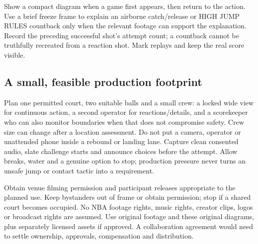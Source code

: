 \documentclass[11pt]{article}
\begin{document}
Show a compact diagram when a game first appears, then return to the action.
Use a brief freeze frame to explain an airborne catch/release or HIGH JUMP RULES
countback only when the relevant footage can support the explanation. Record
the preceding successful shot's attempt count; a countback cannot be truthfully
recreated from a reaction shot. Mark replays and keep the real score visible.

\subsection{A small, feasible production footprint}
Plan one permitted court, two suitable balls and a small crew: a locked wide
view for continuous action, a second operator for reactions/details, and a
scorekeeper who can also monitor boundaries when that does not compromise
safety. Crew size can change after a location assessment. Do not put a camera,
operator or unattended phone inside a rebound or landing lane. Capture clean
consented audio, slate challenge starts and announce choices before the attempt.
Allow breaks, water and a genuine option to stop; production pressure never
turns an unsafe jump or contact tactic into a requirement.

Obtain venue filming permission and participant releases appropriate to the
planned use. Keep bystanders out of frame or obtain permission; stop if a shared
court becomes occupied. No NBA footage rights, music rights, creator clips,
logos or broadcast rights are assumed. Use original footage and these original
diagrams, plus separately licensed assets if approved. A collaboration agreement
would need to settle ownership, approvals, compensation and distribution.
\end{document}
